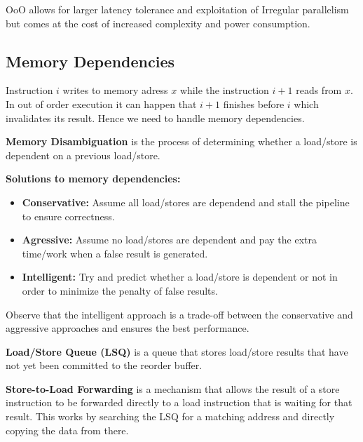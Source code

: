 \begin{remark}
    OoO allows for larger latency tolerance and exploitation of Irregular parallelism but comes at the cost of increased complexity and power consumption.
\end{remark}

\subsection{Memory Dependencies}

\begin{example}
    Instruction $i$ writes to memory adress $x$ while the instruction $i+1$ reads from $x$. In out of order execution it can happen that $i+1$ finishes before $i$ which invalidates its result. Hence we need to handle memory dependencies.
\end{example}

\begin{definition}
    \textbf{Memory Disambiguation} is the process of determining whether a load/store is dependent on a previous load/store.
\end{definition}

\begin{definition}
    \textbf{Solutions to memory dependencies:}
    \begin{itemize}
        \item \textbf{Conservative: } Assume all load/stores are dependend and stall the pipeline to ensure correctness.
        \item \textbf{Agressive: } Assume no load/stores are dependent and pay the extra time/work when a false result is generated.
        \item \textbf{Intelligent: } Try and predict whether a load/store is dependent or not in order to minimize the penalty of false results.
    \end{itemize}
\end{definition}

\begin{remark}
    Observe that the intelligent approach is a trade-off between the conservative and aggressive approaches and ensures the best performance.
\end{remark}

\begin{definition}
    \textbf{Load/Store Queue (LSQ)} is a queue that stores load/store results that have not yet been committed to the reorder buffer.
\end{definition}

\begin{definition}
    \textbf{Store-to-Load Forwarding} is a mechanism that allows the result of a store instruction to be forwarded directly to a load instruction that is waiting for that result. This works by searching the LSQ for a matching address and directly copying the data from there.
\end{definition}


